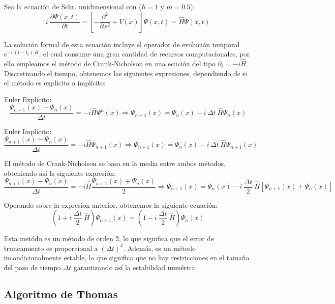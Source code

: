 \documentclass[10pt,onecolumn]{article}
\begin{document}
Sea la ecuación de Schr. unidimensional con ($\hbar = 1$ y $m = 0.5$):
\begin{equation}
    i\ \dfrac{\partial \Psi(x,t)}{\partial t} = [-\dfrac{\partial^2}{\partial x ^2} + V(x)]\Psi(x,t) = \hat{H} \Psi(x,t)
\end{equation}

La solución formal de esta ecuación incluye el operador de evolución temporal $e^{-i\ (t-t_0)\  H}$, el cual consume una gran cantidad de recursos computacionales, por ello empleamos el método de Crank-Nicholson en una ecución del tipo $\partial_t = -i \hat{H}$. Discretizando el tiempo, obtenemos las siguientes expresiones, dependiendo de si el método es explícito o implícito:

Euler Explícito:
\begin{equation}
    \dfrac{\Psi_{n+1}(x) - \Psi_n(x)}{\Delta t} = -i \hat{H} \Psi^n(x) \Rightarrow \Psi_{n+1}(x) = \Psi_n(x) - i\ \Delta t\ \hat{H} \Psi_n(x)
\end{equation}

Euler Implícito:
\begin{equation}
    \dfrac{\Psi_{n+1}(x) - \Psi_n(x)}{\Delta t} = -i \hat{H} \Psi_{n+1}(x) \Rightarrow \Psi_{n+1}(x) = \Psi_n(x) - i\ \Delta t\ \hat{H} \Psi_{n+1}(x)
\end{equation}

El método de Crank-Nicholson se basa en la media entre ambos métodos, obteniendo así la siguiente expresión:
\begin{equation}
    \dfrac{\Psi_{n+1}(x) - \Psi_n(x)}{\Delta t} = -i \hat{H} \dfrac{\Psi_{n+1}(x) + \Psi_n(x)}{2} \Rightarrow \Psi_{n+1}(x) = \Psi_n(x) - i\ \dfrac{\Delta t}{2}\ \hat{H} [\Psi_{n+1}(x) + \Psi_n(x)]
\end{equation}

Operando sobre la expresion anterior, obtenemos la siguiente ecuación:
\begin{equation}
    (1 + i\ \dfrac{\Delta t}{2}\ \hat{H})\Psi_{n+1}(x) = (1 - i\ \dfrac{\Delta t}{2}\ \hat{H})\Psi_n(x)
\end{equation}

Esta metódo es un método de orden 2, lo que significa que el error de truncamiento es proporcional a $(\Delta t)^2$. Además, es un método incondicionalmente estable, lo que significa que no hay restricciones en el tamaño del paso de tiempo $\Delta t$  garantizando así la estabilidad numérica.

\subsection{Algoritmo de Thomas}
\end{document}
